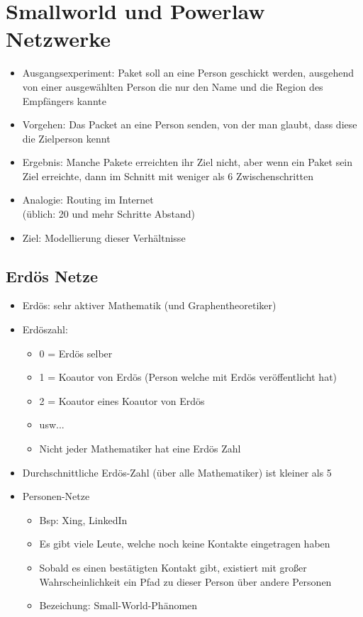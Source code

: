 \documentclass{article} %
\begin{document}
	
	
	\section{Smallworld und Powerlaw Netzwerke}
	\begin{itemize}
		\item Ausgangsexperiment: Paket soll an eine Person geschickt werden, ausgehend von einer ausgewählten Person die nur den Name und die Region des Empfängers kannte 
		\item Vorgehen: Das Packet an eine Person senden, von der man glaubt, dass diese die Zielperson kennt
		\item Ergebnis: Manche Pakete erreichten ihr Ziel nicht, aber wenn ein Paket sein Ziel erreichte,
		dann im Schnitt mit weniger als 6 Zwischenschritten
		\item Analogie: Routing im Internet\\
		(üblich: 20 und mehr Schritte Abstand)
		\item Ziel: Modellierung dieser Verhältnisse
	\end{itemize}
	\subsection{Erdös Netze}
	\begin{itemize}
		\item Erdös: sehr aktiver Mathematik (und Graphentheoretiker)
		\item Erdöszahl:
		\begin{itemize}
			\item 0 = Erdös selber
			\item 1 = Koautor von Erdös (Person welche mit Erdös veröffentlicht hat)
			\item 2 = Koautor eines Koautor von Erdös 
			\item usw...
			\item Nicht jeder Mathematiker hat eine Erdös Zahl
		\end{itemize}
		\item Durchschnittliche Erdös-Zahl (über alle Mathematiker) ist kleiner als 5
		\item Personen-Netze
		\begin{itemize}
			\item Bsp: Xing, LinkedIn
			\item Es gibt viele Leute, welche noch keine Kontakte eingetragen haben
			\item Sobald es einen bestätigten Kontakt gibt, existiert mit großer Wahrscheinlichkeit ein Pfad zu dieser Person über andere Personen
			\item Bezeichung: Small-World-Phänomen
		\end{itemize}
	\end{itemize}
\end{document}
